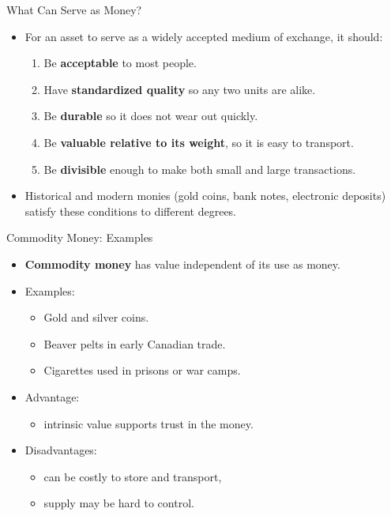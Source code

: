 \documentclass[aspectratio=169]{beamer}
\begin{document}
\begin{frame}{What Can Serve as Money?}
\transfade
\begin{itemize}[<+->]
  \item For an asset to serve as a widely accepted medium of exchange, it should:
  \begin{enumerate}[<+->]
    \item Be \textbf{acceptable} to most people.
    \item Have \textbf{standardized quality} so any two units are alike.
    \item Be \textbf{durable} so it does not wear out quickly.
    \item Be \textbf{valuable relative to its weight}, so it is easy to transport.
    \item Be \textbf{divisible} enough to make both small and large transactions.
  \end{enumerate}
  \item Historical and modern monies (gold coins, bank notes, electronic deposits) satisfy these conditions to different degrees.
\end{itemize}
\end{frame}

\begin{frame}{Commodity Money: Examples}
\transfade
\begin{itemize}[<+->]
  \item \textbf{Commodity money} has value independent of its use as money.
  \item Examples:
  \begin{itemize}[<+->]
    \item Gold and silver coins.
    \item Beaver pelts in early Canadian trade.
    \item Cigarettes used in prisons or war camps.
  \end{itemize}
  \item Advantage:
  \begin{itemize}[<+->]
    \item intrinsic value supports trust in the money.
  \end{itemize}
  \item Disadvantages:
  \begin{itemize}[<+->]
    \item can be costly to store and transport,
    \item supply may be hard to control.
  \end{itemize}
\end{itemize}
\end{frame}
\end{document}
